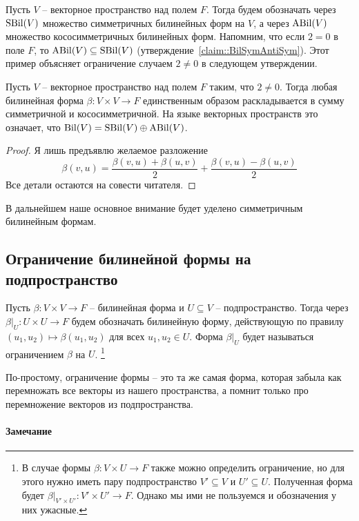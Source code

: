 Пусть $V$ -- векторное пространство над полем $F$.
Тогда будем обозначать через $\operatorname{SBil}(V)$ множество симметричных билинейных форм на $V$, а через $\operatorname{ABil}(V)$ множество кососимметричных билинейных форм.
Напомним, что если $2 = 0$ в поле $F$, то $\operatorname{ABil}(V)\subseteq \operatorname{SBil}(V)$ (утверждение~\ref{claim::BilSymAntiSym}).
Этот пример объясняет ограничение случаем $2 \neq 0$ в следующем утверждении.

\begin{claim}
\label{claim::BilDirectSA}
Пусть $V$ -- векторное пространство над полем $F$ таким, что $2 \neq 0$.
Тогда любая билинейная форма $\beta\colon V\times V\to F$ единственным образом раскладывается в сумму симметричной и кососимметричной.
На языке векторных пространств это означает, что $\operatorname{Bil}(V) = \operatorname{SBil}(V) \oplus \operatorname{ABil}(V)$.
\end{claim}
\begin{proof}
Я лишь предъявлю желаемое разложение 
\[
\beta(v,u) = \frac{\beta(v,u) + \beta(u, v)}{2} + \frac{\beta(v,u) - \beta(u,v)}{2}
\]
Все детали остаются на совести читателя.
\end{proof}

В дальнейшем наше основное внимание будет уделено симметричным билинейным формам.


\subsection{Ограничение билинейной формы на подпространство}

\begin{definition}
Пусть $\beta\colon V\times V\to F$ -- билинейная форма и $U\subseteq V$ -- подпространство.
Тогда через $\beta|_U\colon U\times U\to F$ будем обозначать билинейную форму, действующую по правилу $(u_1, u_2)\mapsto \beta(u_1, u_2)$ для всех $u_1,u_2\in U$.
Форма $\beta|_U$ будет называться ограничением $\beta$ на $U$.%
\footnote{В случае формы $\beta\colon V\times U\to F$ также можно определить ограничение, но для этого нужно иметь пару подпространство $V'\subseteq V$ и $U'\subseteq U$.
Полученная форма будет $\beta|_{V'\times U'}\colon V'\times U' \to F$.
Однако мы ими не пользуемся и обозначения у них ужасные.}
\end{definition}

По-простому, ограничение формы -- это та же самая форма, которая забыла как перемножать все векторы из нашего пространства, а помнит только про перемножение векторов из подпространства.


\paragraph{Замечание}

